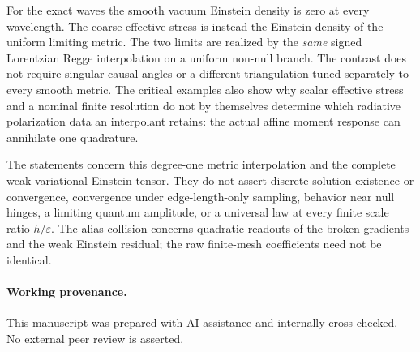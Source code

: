 \documentclass[11pt]{article}
\begin{document}
For the exact waves the smooth vacuum Einstein density is zero
at every wavelength. The coarse effective stress is instead the
Einstein density of the uniform limiting metric. The two
limits are realized by the \emph{same} signed Lorentzian
Regge interpolation on a uniform non-null branch. The contrast
does not require singular causal angles or a different
triangulation tuned separately to every smooth metric.
The critical examples also show why scalar effective stress and
a nominal finite resolution do not by themselves determine
which radiative polarization data an interpolant retains:
the actual affine moment response can annihilate one quadrature.

The statements concern this degree-one metric interpolation and
the complete weak variational Einstein tensor. They do not assert
discrete solution existence or convergence, convergence under
edge-length-only sampling, behavior near null hinges, a limiting
quantum amplitude, or a universal law at every finite scale ratio
\(h/\varepsilon\). The alias collision concerns quadratic
readouts of the broken gradients and the weak Einstein residual;
the raw finite-mesh coefficients need not be identical.

\paragraph{Working provenance.} This manuscript was prepared with AI assistance and internally cross-checked. No external peer review is asserted.
\end{document}
